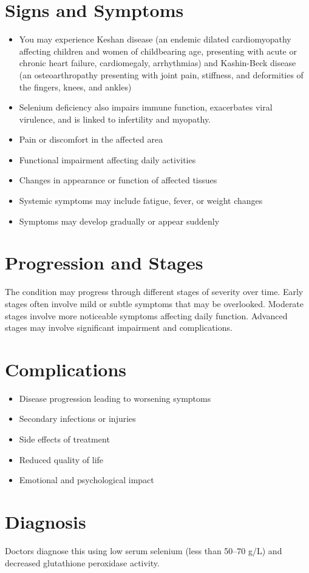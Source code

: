 \section{Signs and Symptoms}
\begin{itemize}[noitemsep]
  \item You may experience Keshan disease (an endemic dilated cardiomyopathy affecting children and women of childbearing age, presenting with acute or chronic heart failure, cardiomegaly, arrhythmias) and Kashin-Beck disease (an osteoarthropathy presenting with joint pain, stiffness, and deformities of the fingers, knees, and ankles)
  \item Selenium deficiency also impairs immune function, exacerbates viral virulence, and is linked to infertility and myopathy.
  \item Pain or discomfort in the affected area
  \item Functional impairment affecting daily activities
  \item Changes in appearance or function of affected tissues
  \item Systemic symptoms may include fatigue, fever, or weight changes
  \item Symptoms may develop gradually or appear suddenly
\end{itemize}
\section{Progression and Stages}
The condition may progress through different stages of severity over time. Early stages often involve mild or subtle symptoms that may be overlooked. Moderate stages involve more noticeable symptoms affecting daily function. Advanced stages may involve significant impairment and complications.
\section{Complications}
\begin{itemize}[noitemsep]
  \item Disease progression leading to worsening symptoms
  \item Secondary infections or injuries
  \item Side effects of treatment
  \item Reduced quality of life
  \item Emotional and psychological impact
\end{itemize}
\section{Diagnosis}
Doctors diagnose this using low serum selenium (less than 50--70 \textmu g/L) and decreased glutathione peroxidase activity.

